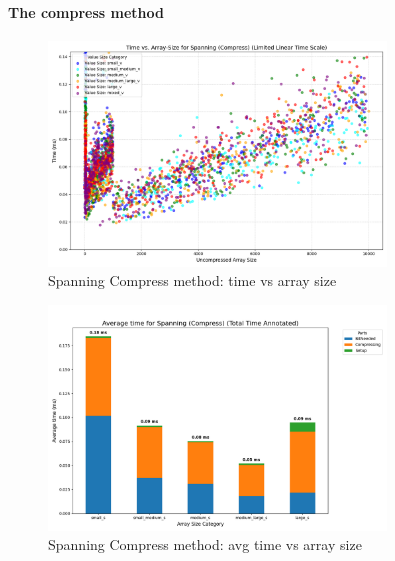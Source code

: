 \documentclass[11pt, a4paper]{article}
\begin{document}
	\paragraph{The compress method}
	\begin{figure}[H]%
		\centering
		\includegraphics[width=0.8\textwidth]{Grafics/Spanning/SpanningCompressTimevsSize.png}
		\caption{Spanning Compress method: time vs array size}
		\label{fig:13}
		
	\end{figure}
	\begin{figure}[H]%
		\centering
		\includegraphics[width=0.8\textwidth]{Grafics/Spanning/SpanningCompressTime.png}
		\caption{Spanning Compress method: avg time vs array size}
		\label{fig:14}
	\end{figure}
	
\end{document}
